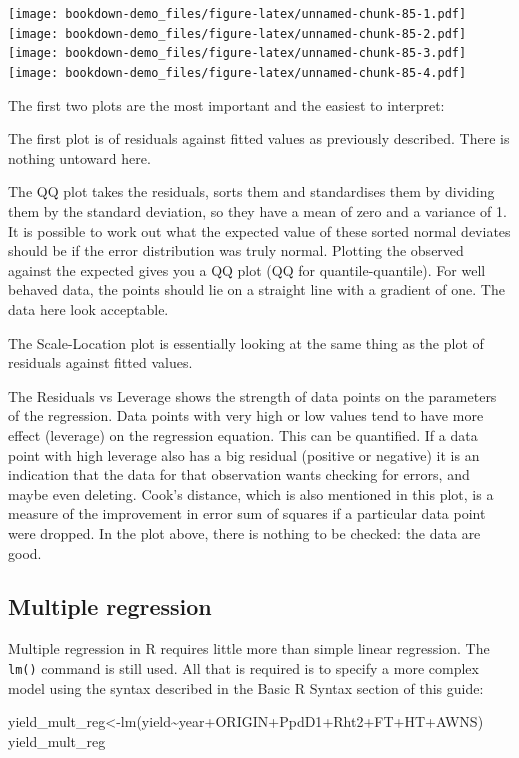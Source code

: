 \documentclass[
]{book}
\newenvironment{Shaded}{\begin{snugshade}}{\end{snugshade}}
\newcommand{\FunctionTok}[1]{\textcolor[rgb]{0.00,0.00,0.00}{#1}}
\newcommand{\NormalTok}[1]{#1}
\newcommand{\OtherTok}[1]{\textcolor[rgb]{0.56,0.35,0.01}{#1}}
\newcommand{\SpecialCharTok}[1]{\textcolor[rgb]{0.00,0.00,0.00}{#1}}
\begin{document}
\texttt{[image: bookdown-demo\_files/figure-latex/unnamed-chunk-85-1.pdf]} \texttt{[image: bookdown-demo\_files/figure-latex/unnamed-chunk-85-2.pdf]} \texttt{[image: bookdown-demo\_files/figure-latex/unnamed-chunk-85-3.pdf]} \texttt{[image: bookdown-demo\_files/figure-latex/unnamed-chunk-85-4.pdf]}

The first two plots are the most important and the easiest to interpret:

The first plot is of residuals against fitted values as previously described. There is nothing untoward here.

The QQ plot takes the residuals, sorts them and standardises them by dividing them by the standard deviation, so they have a mean of zero and a variance of 1. It is possible to work out what the expected value of these sorted normal deviates should be if the error distribution was truly normal. Plotting the observed against the expected gives you a QQ plot (QQ for quantile-quantile). For well behaved data, the points should lie on a straight line with a gradient of one. The data here look acceptable.

The Scale-Location plot is essentially looking at the same thing as the plot of residuals against fitted values.

The Residuals vs Leverage shows the strength of data points on the parameters of the regression. Data points with very high or low values tend to have more effect (leverage) on the regression equation. This can be quantified. If a data point with high leverage also has a big residual (positive or negative) it is an indication that the data for that observation wants checking for errors, and maybe even deleting. Cook's distance, which is also mentioned in this plot, is a measure of the improvement in error sum of squares if a particular data point were dropped. In the plot above, there is nothing to be checked: the data are good.

\hypertarget{multiple-regression}{%
\subsection{Multiple regression}\label{multiple-regression}}

Multiple regression in R requires little more than simple linear regression. The \texttt{lm()} command is still used. All that is required is to specify a more complex model using the syntax described in the Basic R Syntax section of this guide:

\begin{Shaded}
\begin{Highlighting}[]
\NormalTok{yield\_mult\_reg}\OtherTok{\textless{}{-}}\FunctionTok{lm}\NormalTok{(yield}\SpecialCharTok{\textasciitilde{}}\NormalTok{year}\SpecialCharTok{+}\NormalTok{ORIGIN}\SpecialCharTok{+}\NormalTok{PpdD1}\SpecialCharTok{+}\NormalTok{Rht2}\SpecialCharTok{+}\NormalTok{FT}\SpecialCharTok{+}\NormalTok{HT}\SpecialCharTok{+}\NormalTok{AWNS)}
\NormalTok{yield\_mult\_reg}
\end{Highlighting}
\end{Shaded}
\end{document}

